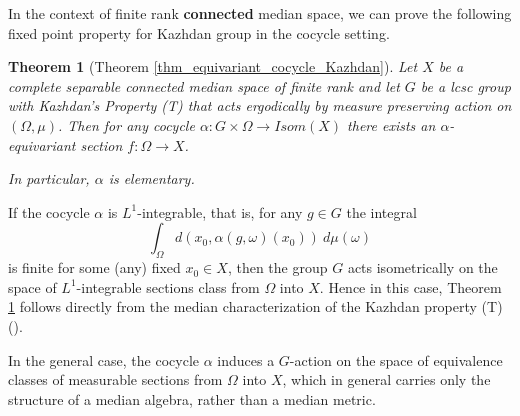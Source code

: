\documentclass{amsart}
\numberwithin{equation}{section}
\newtheorem{theorem}{Theorem}
\newtheorem{corollary}[theorem]{Corollary}
\theoremstyle{definition}
\begin{document}
In the context of finite rank \textbf{connected} median space, we can prove the following fixed point property for Kazhdan group in the cocycle setting.
\begin{theorem}[Theorem \ref{thm_equivariant_cocycle_Kazhdan}]\label{thm_equivariant_cocycle_Kazhdan_introduction}
     Let $X$ be a complete separable connected median space of finite rank and let $G$ be a lcsc group with Kazhdan's Property (T) that acts ergodically by measure preserving action on $(\Omega,\mu)$. Then for any cocycle $\alpha:G\times\Omega\rightarrow Isom(X)$ there exists an $\alpha$-equivariant section $f:\Omega\rightarrow X$. \par 
     In particular, $\alpha$ is elementary.
\end{theorem}
If the cocycle $\alpha$ is $L^1$-integrable, that is, for any $g\in G$ the integral $$\int_\Omega d(x_0,\alpha(g,\omega)(x_0)) \ d\mu(\omega)$$ is finite for some (any) fixed $x_0\in X$, then the group $G$ acts isometrically on the space of $L^1$-integrable sections class from $\Omega$ into $X$. Hence in this case, Theorem \ref{thm_equivariant_cocycle_Kazhdan_introduction} follows directly from the median characterization of the Kazhdan property (T) (\cite{ChaDH_median}). \par
In the general case, the cocycle $\alpha$ induces a $G$-action on the space of equivalence classes of measurable sections from $\Omega$ into $X$, which in general carries only the structure of a median algebra, rather than a median metric.


\end{document}
